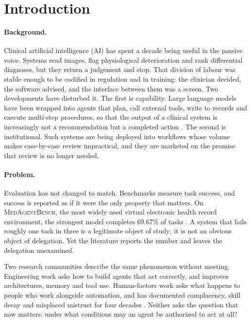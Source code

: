 \section{Introduction}
\label{sec:intro}

\paragraph{Background.}
Clinical artificial intelligence (AI) has spent a decade being useful in the passive voice. Systems read images, flag physiological deterioration and rank differential diagnoses, but they return a judgement and stop. That division of labour was stable enough to be codified in regulation and in training: the clinician decided, the software advised, and the interface between them was a screen. Two developments have disturbed it. The first is capability. Large language models have been wrapped into agents that plan, call external tools, write to records and execute multi-step procedures, so that the output of a clinical system is increasingly not a recommendation but a completed action \citep{wang2025baymax}. The second is institutional. Such systems are being deployed into workflows whose volume makes case-by-case review impractical, and they are marketed on the promise that review is no longer needed.

\paragraph{Problem.}
Evaluation has not changed to match. Benchmarks measure task success, and success is reported as if it were the only property that matters. On \textsc{MedAgentBench}, the most widely used virtual electronic health record environment, the strongest model completes 69.67\% of tasks \citep{jiang2025medagentbench}. A system that fails roughly one task in three is a legitimate object of study; it is not an obvious object of delegation. Yet the literature reports the number and leaves the delegation unexamined.

Two research communities describe the same phenomenon without meeting. Engineering work asks how to build agents that act correctly, and improves architectures, memory and tool use. Human-factors work asks what happens to people who work alongside automation, and has documented complacency, skill decay and misplaced mistrust for four decades \citep{parasuraman2010}. Neither asks the question that now matters: under what conditions may an agent be authorized to act at all?

